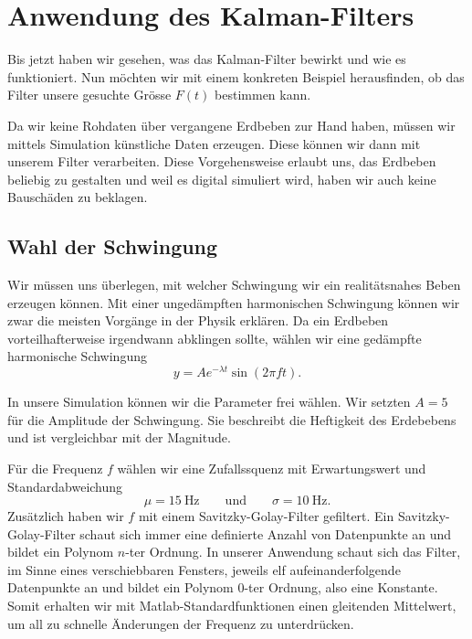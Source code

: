 \section{Anwendung des Kalman-Filters}
Bis jetzt haben wir gesehen, was das Kalman-Filter bewirkt und wie es funktioniert.
Nun möchten wir mit einem konkreten Beispiel herausfinden,
ob das Filter unsere gesuchte Grösse $F(t)$ bestimmen kann.

Da wir keine Rohdaten über vergangene Erdbeben zur Hand haben,
müssen wir mittels Simulation künstliche Daten erzeugen.
Diese können wir dann mit unserem Filter verarbeiten.
Diese Vorgehensweise erlaubt uns, das Erdbeben beliebig zu gestalten
und weil es digital simuliert wird, haben wir auch keine Bauschäden zu beklagen.

\subsection{Wahl der Schwingung}
Wir müssen uns überlegen, mit welcher Schwingung wir ein realitätsnahes Beben erzeugen können.
Mit einer ungedämpften harmonischen Schwingung können wir zwar die meisten Vorgänge in der Physik erklären.
Da ein Erdbeben vorteilhafterweise irgendwann abklingen sollte,
wählen wir eine gedämpfte harmonische Schwingung
\begin{equation}
  y = A e^{-\lambda t} \sin(2\pi f t).
\end{equation}

In unsere Simulation können wir die Parameter frei wählen.
Wir setzten $A = 5$ für die Amplitude der Schwingung.
Sie beschreibt die Heftigkeit des Erdebebens und ist vergleichbar mit der Magnitude.

Für die Frequenz $f$ wählen wir eine Zufallssquenz mit Erwartungswert und Standardabweichung
\begin{equation}
  \mu = \SI{15}{\hertz}
  \qquad\text{und}\qquad
  \sigma = \SI{10}{\hertz}.
\end{equation}
Zusätzlich haben wir $f$ mit einem Savitzky-Golay-Filter gefiltert.
%
Ein Savitzky-Golay-Filter schaut sich immer eine definierte Anzahl von Datenpunkte an
und bildet ein Polynom $n$-ter Ordnung.
In unserer Anwendung schaut sich das Filter, im Sinne eines verschiebbaren Fensters,
jeweils elf aufeinanderfolgende Datenpunkte an und bildet ein Polynom $0$-ter Ordnung,
also eine Konstante.
Somit erhalten wir mit Matlab-Standardfunktionen einen gleitenden Mittelwert,
%
um all zu schnelle Änderungen der Frequenz zu unterdrücken.

